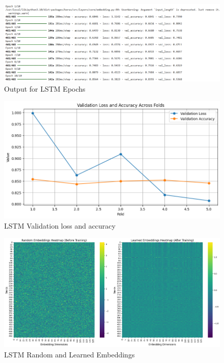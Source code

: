 \begin{figure}[h!]  
    \centering
    \includegraphics[width=1.0\textwidth]{Images/LSTM Epoch.png}  
    \caption*{Output for LSTM Epochs}
    \label{LSTm Epochs}  %
\end{figure}

\pagebreak

\begin{figure}[h!]  
    \centering
    \includegraphics[width=1.0\textwidth]{Images/LSTM LA.png}  
    \caption*{LSTM Validation loss and accuracy}
    \label{Accuracy Loss}  %
\end{figure}

\begin{figure}[h!]  
    \centering
    \includegraphics[width=1.0\textwidth]{Images/LSTM EMBED.png}  
    \caption*{LSTM Random and Learned Embeddings}
    \label{lstm embed}  %
\end{figure}

